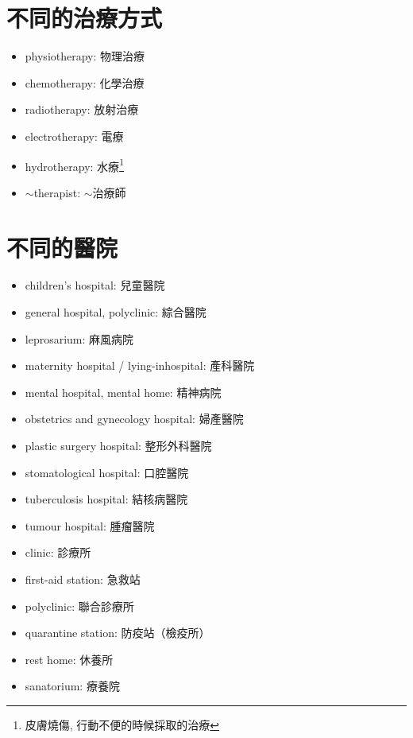 \section{不同的治療方式}
\begin{multicols}{2}
\begin{itemize}
  \itemsep0em
  \item physiotherapy: 物理治療
  \item chemotherapy: 化學治療
  \item radiotherapy: 放射治療
  \item electrotherapy: 電療
  \item hydrotherapy: 水療\footnote{皮膚燒傷, 行動不便的時候採取的治療}
  \item $\sim$therapist: $\sim$治療師
\end{itemize}
\end{multicols}

\section{不同的醫院}
\begin{multicols}{2}
\begin{itemize}
  \itemsep0em
  \item children's hospital: 兒童醫院
  \item general hospital, polyclinic: 綜合醫院
  \item leprosarium: 麻風病院
  \item maternity hospital / lying-inhospital: 產科醫院
  \item mental hospital, mental home: 精神病院
  \item obstetrics and gynecology hospital: 婦產醫院
  \item plastic surgery hospital: 整形外科醫院
  \item stomatological hospital: 口腔醫院
  \item tuberculosis hospital: 結核病醫院
  \item tumour hospital: 腫瘤醫院
  \item clinic: 診療所
  \item first-aid station: 急救站
  \item polyclinic: 聯合診療所
  \item quarantine station: 防疫站（檢疫所）
  \item rest home: 休養所
  \item sanatorium: 療養院
\end{itemize}
\end{multicols}

